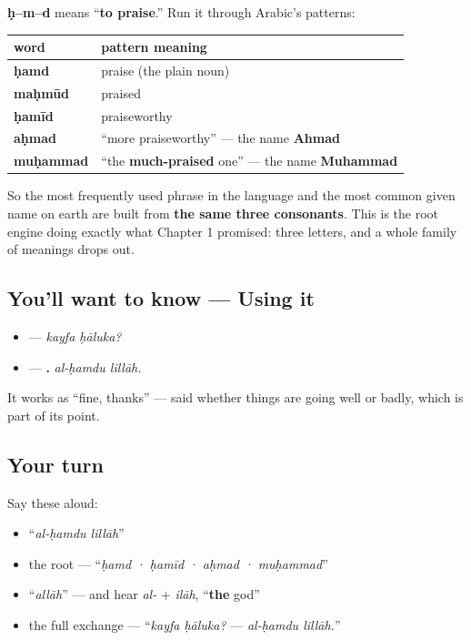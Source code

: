 \begin{culture}
\textbf{ḥ–m–d} means \textquotedblleft{}\textbf{to praise}.\textquotedblright{} Run it through Arabic's patterns:

\noindent
\begin{tabularx}{\linewidth}{@{}>{\raggedright\arraybackslash}X>{\raggedright\arraybackslash}X@{}}
\toprule
\textbf{word} & \textbf{pattern meaning} \\
\midrule
\textbf{ḥamd} & praise (the plain noun) \\
\textbf{maḥmūd} & praised \\
\textbf{ḥamīd} & praiseworthy \\
\textbf{aḥmad} & \textquotedblleft{}more praiseworthy\textquotedblright{} — the name \textbf{Ahmad} \\
\textbf{muḥammad} & \textquotedblleft{}the \textbf{much-praised} one\textquotedblright{} — the name \textbf{Muhammad} \\
\bottomrule
\end{tabularx}

So the most frequently used phrase in the language and the most common given name on earth are built from \textbf{the same three consonants}. This is the root engine doing exactly what Chapter 1 promised: three letters, and a whole family of meanings drops out.
\end{culture}

\subsection*{You'll want to know — Using it}
\begin{itemize}
\raggedright
  \item — \emph{kayfa ḥāluka?}
  \item — \textbf{ .} \emph{al-ḥamdu lillāh.}
\end{itemize}

It works as \textquotedblleft{}fine, thanks\textquotedblright{} — said whether things are going well or badly, which is part of its point.

\subsection*{Your turn}
Say these aloud:

\begin{itemize}
\raggedright
  \item \textquotedblleft{}\emph{al-ḥamdu lillāh}\textquotedblright{}
  \item the root — \textquotedblleft{}\emph{ḥamd · ḥamīd · aḥmad · muḥammad}\textquotedblright{}
  \item \textquotedblleft{}\emph{allāh}\textquotedblright{} — and hear \emph{al-} + \emph{ilāh}, \textquotedblleft{}\textbf{the} god\textquotedblright{}
  \item the full exchange — \textquotedblleft{}\emph{kayfa ḥāluka?} — \emph{al-ḥamdu lillāh.}\textquotedblright{}
\end{itemize}

